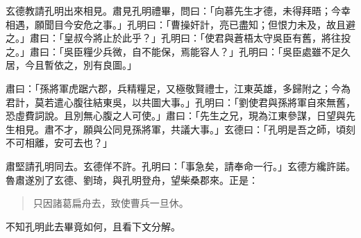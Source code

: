 玄德教請孔明出來相見。肅見孔明禮畢，問曰：「向慕先生才德，未得拜晤；今幸相遇，願聞目今安危之事。」孔明曰：「曹操奸計，亮已盡知；但恨力未及，故且避之。」肅曰：「皇叔今將止於此乎？」孔明曰：「使君與蒼梧太守吳臣有舊，將往投之。」肅曰：「吳臣糧少兵微，自不能保，焉能容人？」孔明曰：「吳臣處雖不足久居，今且暫依之，別有良圖。」

肅曰：「孫將軍虎踞六郡，兵精糧足，又極敬賢禮士，江東英雄，多歸附之；今為君計，莫若遣心腹往結東吳，以共圖大事。」孔明曰：「劉使君與孫將軍自來無舊，恐虛費詞說。且別無心腹之人可使。」肅曰：「先生之兄，現為江東參謀，日望與先生相見。肅不才，願與公同見孫將軍，共議大事。」玄德曰：「孔明是吾之師，頃刻不可相離，安可去也？」

肅堅請孔明同去。玄德佯不許。孔明曰：「事急矣，請奉命一行。」玄德方纔許諾。魯肅遂別了玄德、劉琦，與孔明登舟，望柴桑郡來。正是：

\begin{quote}
只因諸葛扁舟去，致使曹兵一旦休。
\end{quote}

不知孔明此去畢竟如何，且看下文分解。
